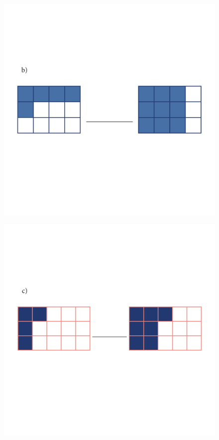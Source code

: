 \begin{figure}[htpb!]
\includegraphics[width=\textwidth]{../ilustracoes/MAT5/SAEB_5ANO_MAT_figura69-2.png}
\end{figure}

\begin{figure}[htpb!]
\includegraphics[width=\textwidth]{../ilustracoes/MAT5/SAEB_5ANO_MAT_figura69-3.png}
\end{figure}

